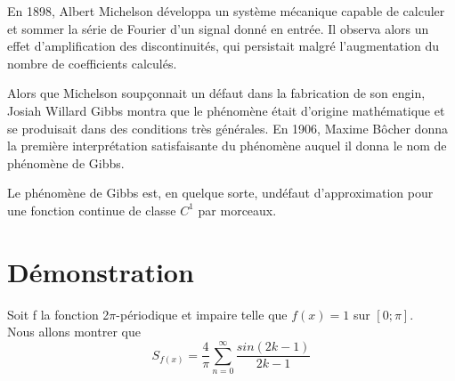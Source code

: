 \documentclass[a4paper,12pt]{report}
\begin{document}
En 1898, Albert Michelson d\'eveloppa un syst\`eme m\'ecanique capable de calculer et sommer la s\'erie de Fourier d'un signal donn\'e en entr\'ee. Il observa alors un effet d'amplification des discontinuit\'es, qui persistait malgr\'e l'augmentation du nombre de coefficients calcul\'es.

Alors que Michelson soup\c connait un d\'efaut dans la fabrication de son engin, Josiah Willard Gibbs montra que le ph\'enom\`ene \'etait d'origine math\'ematique et se produisait dans des conditions tr\`es g\'en\'erales. En 1906, Maxime B\^ocher donna la premi\`ere interpr\'etation satisfaisante du ph\'enom\`ene auquel il donna le nom de ph\'enom\`ene de Gibbs.

Le ph\'enom\`ene de Gibbs est, en quelque sorte, un\og d\'efaut d'approximation \fg  pour une fonction continue de classe $C^1$ par morceaux. \newpage

\section{D\'emonstration}
Soit f la fonction 2$\pi$-p\'eriodique et impaire telle que $f(x) = 1$ sur $[0; \pi]$.\\

Nous allons montrer que \[S_{f(x)}=\frac{4}{\pi}\sum\limits_{n=0}^{\infty}\frac{sin(2k-1)}{2k-1}\]
\end{document}
